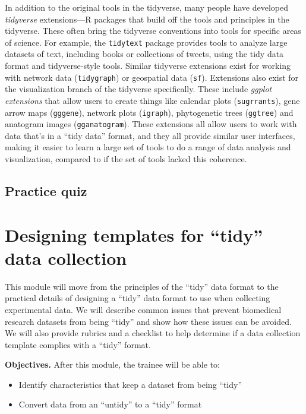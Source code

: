 \documentclass[]{tufte-book}
\providecommand{\tightlist}{%
  \setlength{\itemsep}{0pt}\setlength{\parskip}{0pt}}
\begin{document}
In addition to the original tools in the tidyverse, many people have developed
\emph{tidyverse} extensions---R packages that build off the tools and principles in
the tidyverse. These often bring the tidyverse conventions into tools for
specific areas of science. For example, the \texttt{tidytext} package provides tools to
analyze large datasets of text, including books or collections of tweets, using
the tidy data format and tidyverse-style tools. Similar tidyverse extensions
exist for working with network data (\texttt{tidygraph}) or geospatial data (\texttt{sf}).
Extensions also exist for the visualization branch of the tidyverse
specifically. These include \emph{ggplot extensions} that allow users to create
things like calendar plots (\texttt{sugrrants}), gene arrow maps (\texttt{gggene}), network
plots (\texttt{igraph}), phytogenetic trees (\texttt{ggtree}) and anatogram images
(\texttt{gganatogram}). These extensions all allow users to work with data that's in a
``tidy data'' format, and they all provide similar user interfaces, making it
easier to learn a large set of tools to do a range of data analysis and
visualization, compared to if the set of tools lacked this coherence.

\hypertarget{practice-quiz}{%
\subsection{Practice quiz}\label{practice-quiz}}

\hypertarget{module4}{%
\section{Designing templates for ``tidy'' data collection}\label{module4}}

This module will move from the principles of the ``tidy'' data format to the
practical details of designing a ``tidy'' data format to use when collecting
experimental data. We will describe common issues that prevent biomedical
research datasets from being ``tidy'' and show how these issues can be avoided. We
will also provide rubrics and a checklist to help determine if a data collection
template complies with a ``tidy'' format.

\textbf{Objectives.} After this module, the trainee will be able to:

\begin{itemize}
\tightlist
\item
  Identify characteristics that keep a dataset from being ``tidy''
\item
  Convert data from an ``untidy'' to a ``tidy'' format
\end{itemize}
\end{document}
